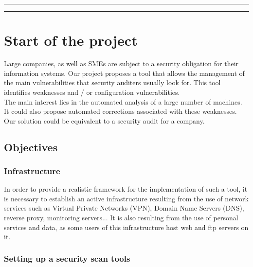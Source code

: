 \pagebreak

\noindent\rule{\textwidth}{.1pt}%
\tableofcontents
\noindent\rule{\textwidth}{.1pt}%

\pagebreak

\section{Start of the project}


Large companies, as well as SMEs are subject to a security obligation
for their information systems. Our project proposes a tool that allows the
management of the main vulnerabilities that security auditers usually look for.
This tool identifies weaknesses and / or configuration vulnerabilities.
\\
The main interest lies in the automated analysis of a large number of machines.
It could also propose automated corrections associated with these weaknesses.
Our solution could be equivalent to a security audit for a company.

\vspace{1cm}
\subsection{Objectives}
\vspace{0.5cm}

\subsubsection{Infrastructure}

In order to provide a realistic framework for the implementation of such a tool, it is necessary to establish an active infrastructure resulting from the use of network services such as Virtual Private Networks (VPN), Domain Name Servers (DNS), reverse proxy, monitoring servers... It is also resulting from the use of personal services and data, as some users of this infrastructure host web and ftp servers on it.

\vspace{0.5cm}
\subsubsection{Setting up a security scan tools}

